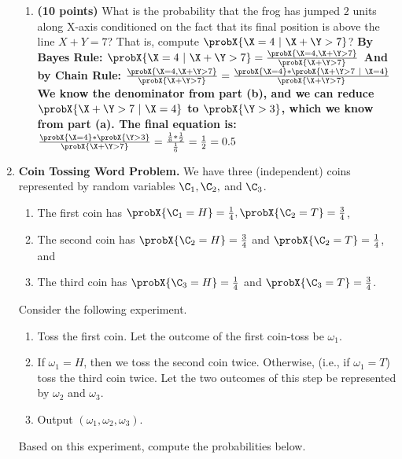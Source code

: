 \documentclass[11pt]{article}
\begin{document}
\begin{enumerate}
\begin{enumerate}
       \item {\bfseries (10 points)} What is the probability that the frog has jumped $2$ units along X-axis conditioned on the fact that its final position is above the line $X+Y=7$?
       That is, compute $\probX{\X=4 ~|~ \X+\Y >7}$?
      \bfseries{
        \newline
        \newline
        By Bayes Rule: \newline
        $\probX{\X=4 ~|~ \X+\Y >7} = \frac{\probX{\X= 4, \X+\Y >7}}{\probX{\X+\Y >7}}$ \newline
        And by Chain Rule: \newline
        $\frac{\probX{\X= 4, \X+\Y >7}}{\probX{\X+\Y >7}} = \frac{\probX{\X= 4} * \probX{\X+\Y >7 ~|~ \X= 4}}{\probX{\X+\Y >7}}$ \newline
        \newline
        We know the denominator from part (b), and we can reduce $\probX{\X+\Y >7 ~|~ \X= 4}$ to $\probX{\Y >3}$, which we know from part (a). The final equation is: \newline
        $\frac{\probX{\X= 4} * \probX{\Y >3}}{\probX{\X+\Y >7}} = \frac{\frac{1}{6} * \frac{1}{2}}{\frac{1}{6}} = \frac{1}{2} = 0.5$
      }
  \end{enumerate}
  \newpage
  \item {\bfseries Coin Tossing Word Problem.}
  We have three (independent) coins represented by random variables $\C_1,\C_2,$ and $\C_3$.
  \begin{enumerate}[label=(\roman*)]
      \item The first coin has $\probX{\C_1=H}=\frac14,
      \probX{\C_2=T}=\frac34$, 
      \item The second coin has $\probX{\C_2=H}=\frac34$ and $\probX{\C_2=T}=\frac14$, and
      \item The third coin has $\probX{\C_3=H}=\frac14$ and $\probX{\C_3=T}=\frac34$. 
  \end{enumerate}
  
  Consider the following experiment. 
  \begin{enumerate}[label=(\Alph*)]
      \item Toss the first coin. Let the outcome of the first coin-toss be $\omega_1$. 
      \item If $\omega_1=H$, then we toss the second coin twice. 
        Otherwise, (i.e., if $\omega_1=T$) toss the third coin twice. 
        Let the two outcomes of this step be represented by $\omega_2$ and $\omega_3$. 
      \item Output $(\omega_1,\omega_2,\omega_3)$.
  \end{enumerate}
  Based on this experiment, compute the probabilities below. 


\end{enumerate}
\end{document}
